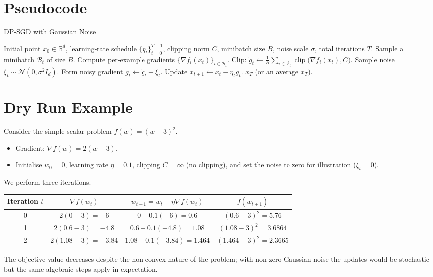 \documentclass[11pt]{article}
\newcommand{\R}{\mathbb{R}}
\newcommand{\grad}{\nabla}
\begin{document}
\section*{Pseudocode}
\begin{algorithm}[H]
\caption{DP‑SGD with Gaussian Noise}
\begin{algorithmic}[1]
\Require Initial point $x_0\in\R^{d}$, learning‑rate schedule $\{\eta_t\}_{t=0}^{T-1}$,
        clipping norm $C$, minibatch size $B$, noise scale $\sigma$,
        total iterations $T$.
    \State Sample a minibatch $\mathcal{B}_t$ of size $B$.
    \State Compute per‑example gradients $\{ \grad f_i(x_t)\}_{i\in\mathcal{B}_t}$.
    \State Clip: $\tilde g_t \gets \frac{1}{B}\sum_{i\in\mathcal{B}_t}
            \operatorname{clip}\!\bigl(\grad f_i(x_t),C\bigr)$.
    \State Sample noise $\xi_t\sim\mathcal N(0,\sigma^{2}I_d)$.
    \State Form noisy gradient $g_t \gets \tilde g_t + \xi_t$.
    \State Update $x_{t+1} \gets x_t - \eta_t g_t$.
\EndFor
\State \Return $x_T$ (or an average $\bar x_T$).
\end{algorithmic}
\end{algorithm}

\section*{Dry Run Example}
Consider the simple scalar problem $f(w)=(w-3)^2$.
\begin{itemize}
    \item Gradient: $\grad f(w)=2(w-3)$.
    \item Initialise $w_0=0$, learning rate $\eta=0.1$, clipping $C=\infty$ (no clipping),
          and set the noise to zero for illustration ($\xi_t=0$).
\end{itemize}
We perform three iterations.

\begin{center}
\begin{tabular}{c|c|c|c}
Iteration $t$ & $\grad f(w_t)$ & $w_{t+1}=w_t-\eta\grad f(w_t)$ & $f(w_{t+1})$\\\hline
0 & $2(0-3)=-6$ & $0-0.1(-6)=0.6$ & $(0.6-3)^2=5.76$\\
1 & $2(0.6-3)=-4.8$ & $0.6-0.1(-4.8)=1.08$ & $(1.08-3)^2=3.6864$\\
2 & $2(1.08-3)=-3.84$ & $1.08-0.1(-3.84)=1.464$ & $(1.464-3)^2=2.3665$\\
\end{tabular}
\end{center}
The objective value decreases despite the non‑convex nature of the problem; with non‑zero Gaussian noise the updates would be stochastic but the same algebraic steps apply in expectation.
\end{document}
